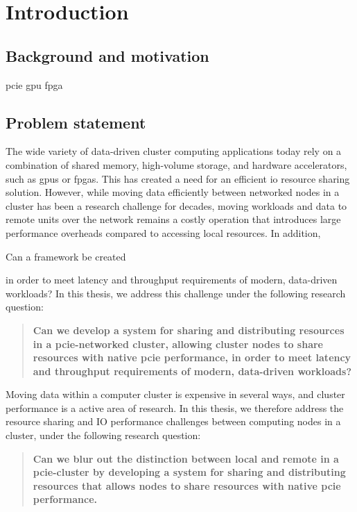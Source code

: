 \chapter{Introduction}\label{sec:intro}
\section{Background and motivation}
\gls{pcie}
\gls{gpu}
\gls{fpga}

\section{Problem statement}\label{sec:objectives}
The wide variety of data-driven cluster computing applications today rely on a combination of shared memory, high-volume storage, and hardware accelerators, such as \glspl{gpu} or \glspl{fpga}.
This has created a need for an efficient \gls{io} resource sharing solution.
%
However, while moving data efficiently between networked nodes in a cluster has been a research challenge for decades, moving workloads and data to remote units over the network remains a costly operation that introduces large performance overheads compared to accessing local resources.
%
In addition, \cite{Markussen2019}

Can a framework be created

	in order to meet latency and throughput requirements of modern, data-driven workloads?
In this thesis, we address this challenge under the following research question:
\begin{quote}\bfseries
	Can we develop a system for sharing and distributing resources in a \gls{pcie}-networked cluster, allowing cluster nodes to share resources with native \gls{pcie} performance,
	in order to meet latency and throughput requirements of modern, data-driven workloads?
\end{quote}

Moving data within a computer cluster is expensive in several ways, and cluster performance is a active area of research. 
In this thesis, we therefore address the resource sharing and IO performance challenges between computing nodes in a cluster, under the following research question: 

\begin{quote}\label{q2}\bfseries
	Can we blur out the distinction between local and remote in a \gls{pcie}-cluster by developing a system for sharing and distributing resources
	that allows nodes to share resources with native \gls{pcie} performance.
\end{quote}

